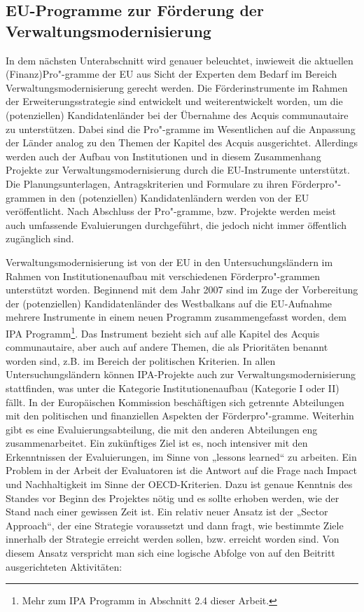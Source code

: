 \subsection{EU-Programme zur Förderung der Verwaltungsmodernisierung }
In dem nächsten Unterabschnitt wird genauer beleuchtet, inwieweit die aktuellen (Finanz)Pro"-gramme der EU aus Sicht der Experten dem Bedarf im Bereich Verwaltungsmodernisierung gerecht werden. Die Förderinstrumente im Rahmen der Erweiterungsstrategie sind entwickelt und weiterentwickelt worden, um die (potenziellen) Kandidatenländer bei der Übernahme des Acquis communautaire zu unterstützen. Dabei sind die Pro"-gramme im Wesentlichen auf die Anpassung der Länder analog zu den Themen der Kapitel des Acquis ausgerichtet. Allerdings werden auch der Aufbau von Institutionen und in diesem Zusammenhang Projekte zur Verwaltungsmodernisierung durch die EU-Instrumente unterstützt. Die Planungsunterlagen, Antragskriterien und Formulare zu ihren Förderpro"-grammen in den (potenziellen) Kandidatenländern werden von der EU veröffentlicht. Nach Abschluss der Pro"-gramme, bzw. Projekte werden meist auch umfassende Evaluierungen durchgeführt, die jedoch nicht immer öffentlich zugänglich sind.\par
Verwaltungsmodernisierung ist von der EU in den Untersuchungsländern im Rahmen von Institutionenaufbau mit verschiedenen Förderpro"-grammen unterstützt worden. Beginnend mit dem Jahr 2007 sind im Zuge der Vorbereitung der (potenziellen) Kandidatenländer des Westbalkans auf die EU-Aufnahme mehrere Instrumente in einem neuen Programm zusammengefasst worden, dem IPA Programm\footnote{Mehr zum IPA Programm in Abschnitt 2.4 dieser Arbeit.}. Das Instrument bezieht sich auf alle Kapitel des Acquis communautaire, aber auch auf andere Themen, die als Prioritäten benannt worden sind, z.B. im Bereich der politischen Kriterien. In allen Untersuchungsländern können IPA-Projekte auch zur Verwaltungsmodernisierung stattfinden, was unter die Kategorie Institutionenaufbau (Kategorie I oder II) fällt. In der Europäischen Kommission beschäftigen sich getrennte Abteilungen mit den politischen und finanziellen Aspekten der Förderpro"-gramme. Weiterhin gibt es eine Evaluierungsabteilung, die mit den anderen Abteilungen eng zusammenarbeitet. Ein zukünftiges Ziel ist es, noch intensiver mit den Erkenntnissen der Evaluierungen, im Sinne von „lessons learned“ zu arbeiten. Ein Problem in der Arbeit der Evaluatoren ist die Antwort auf die Frage nach Impact und Nachhaltigkeit im Sinne der OECD-Kriterien. Dazu ist genaue Kenntnis des Standes vor Beginn des Projektes nötig und es sollte erhoben werden, wie der Stand nach einer gewissen Zeit ist. Ein relativ neuer Ansatz ist der „Sector Approach“, der eine Strategie voraussetzt und dann fragt, wie bestimmte Ziele innerhalb der Strategie erreicht werden sollen, bzw. erreicht worden sind. Von diesem Ansatz verspricht man sich eine logische Abfolge von auf den Beitritt ausgerichteten Aktivitäten:
